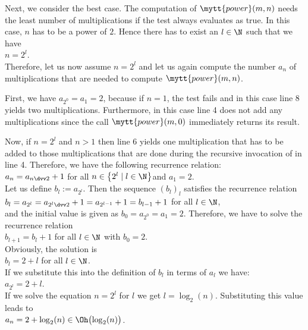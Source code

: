 Next, we consider the best case.  The computation of
$\mytt{power}(m,n)$ needs the least number of multiplications if the test 
always evaluates as true.  In this case, $n$ has to be a power of $2$.  
Hence there has to exist an $l\in \N$ such that we have
 \\[0.2cm]
\hspace*{1.3cm} $n = 2^l$.
 \\[0.2cm]
Therefore, let us now assume $n = 2^l$ and let us again compute the number $a_n$ of multiplications
that are needed to compute $\mytt{power}(m,n)$. 

First, we have $a_{2^0} = a_1 = 2$, because if $n = 1$, the test  fails and in
this case line 8 yields two multiplications.  Furthermore, in this case
line 4 does not add any multiplications since the call $\mytt{power}(m,0)$ immediately returns its
result.

Now, if $n = 2^l$ and $n > 1$ then line 6 yields one multiplication that 
has to be added to those multiplications that are done during the recursive invocation of
 in line 4.  Therefore, we have the following recurrence relation:
 \\[0.2cm]
\hspace*{1.3cm} $a_n = a_{n \dvv 2} + 1$ \qquad for all $n \in \left\{2^l \mid l \in \N\right\}$\quad and
$a_1 = 2$. 
\\[0.2cm]
Let us define $b_l := a_{2^l}$.  Then the sequence $(b_l)_l$ satisfies the recurrence relation
 \\[0.2cm]
\hspace*{1.3cm} 
$b_l = a_{2^l} = a_{2^l \dvv 2} + 1 = a_{2^{l-1}} + 1 = b_{l-1} + 1$ \qquad for all $l\in\N$, \\[0.2cm]
and the initial value is given as $b_0 = a_{2^0} = a_1 = 2$.
Therefore, we have to solve the recurrence relation 
\\[0.2cm]
\hspace*{1.3cm}
 $b_{l+1} = b_l + 1$ \qquad for all $l \in \N$ \quad with $b_0 = 2$.\\[0.2cm]
Obviously, the solution is \\[0.2cm]
\hspace*{1.3cm} $b_l = 2 + l$ \qquad for all $l\in\N$.
\\[0.2cm]
If we substitute this into the definition of $b_l$ in terms of $a_l$ we have: \\[0.2cm]
\hspace*{1.3cm}
$a_{2^l} = 2 + l$. 
\\[0.2cm]
If we solve the equation $n = 2^l$ for  $l$ we get $l =
\log_2(n)$. Substituting this value leads to
\\[0.2cm]
\hspace*{1.3cm}
 $a_n = 2 + \log_2(n) \in \Oh\bigl(\log_2(n)\bigr)$.
\vspace*{0.3cm}

